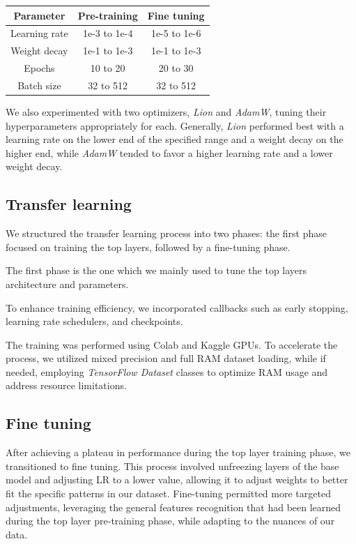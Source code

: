 \documentclass[11pt]{article}
\begin{document}
\begin{table}[h!]
    \centering
    \begin{tabular}{|c|c|c|}
        \hline
        \textbf{Parameter} & \textbf{Pre-training} & \textbf{Fine tuning} \\ \hline
        Learning rate & 1e-3 to 1e-4 & 1e-5 to 1e-6 \\ \hline
        Weight decay & 1e-1 to 1e-3 & 1e-1 to 1e-3 \\ \hline
        Epochs & 10 to 20 & 20 to 30 \\ \hline
        Batch size & 32 to 512 & 32 to 512 \\ \hline
    \end{tabular}
\end{table}
We also experimented with two optimizers, \textit{Lion} and \textit{AdamW}, tuning their hyperparameters appropriately for each. Generally, \textit{Lion} performed best with a learning rate on the lower end of the specified range and a weight decay on the higher end, while \textit{AdamW} tended to favor a higher learning rate and a lower weight decay.
\subsection{Transfer learning}

We structured the transfer learning process into two phases: the first phase focused on training the top layers, followed by a fine-tuning phase.

The first phase is the one which we mainly used to tune the top layers architecture and parameters.

To enhance training efficiency, we incorporated callbacks such as early stopping, learning rate schedulers, and checkpoints.

The training was performed using Colab and Kaggle GPUs. To accelerate the process, we utilized mixed precision and full RAM dataset loading, while if needed, employing \textit{TensorFlow Dataset} classes to optimize RAM usage and address resource limitations.

\subsection{Fine tuning}

After achieving a plateau in performance during the top layer training phase, we transitioned to fine tuning. 
This process involved unfreezing layers of the base model and adjusting LR to a lower value, allowing it to adjust weights to better fit the specific patterns in our dataset. 
Fine-tuning permitted more targeted adjustments, leveraging the general features recognition that had been learned during the top layer pre-training phase, while adapting to the nuances of our data.
\end{document}
